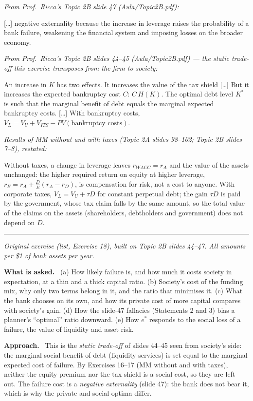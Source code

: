 \documentclass[11pt,a4paper]{article}
\numberwithin{equation}{section}
\newcommand{\asked}{\par\medskip\noindent\textbf{What is asked.}~}
\newcommand{\approach}{\par\smallskip\noindent\textbf{Approach.}~}
\newcommand{\stmtend}{\par\endgroup\nopagebreak\noindent\rule{\linewidth}{0.4pt}\par\medskip}
\begin{document}
\emph{From Prof.~Ricca's Topic 2B slide 47 (Aula/Topic2B.pdf):}

{[}\ldots{]} negative externality because the increase in leverage raises the probability of a bank
failure, weakening the financial system and imposing losses on the broader economy.

\emph{From Prof.~Ricca's Topic 2B slides 44--45 (Aula/Topic2B.pdf) --- the static trade-off this
exercise transposes from the firm to society:}

An increase in \(K\) has two effects. It increases the value of the tax shield {[}\ldots{]} But it
increases the expected bankruptcy cost \(C\): \(C\,H(K)\). The optimal debt level \(K^*\) is such
that the marginal benefit of debt equals the marginal expected bankruptcy costs. {[}\ldots{]} With
bankruptcy costs, \(V_L = V_U + V_{ITS} - PV(\text{bankruptcy costs})\).

\emph{Results of MM without and with taxes (Topic 2A slides 98--102; Topic 2B slides 7--8),
restated:}

Without taxes, a change in leverage leaves \(r_{WACC} = r_A\) and the value of the assets unchanged:
the higher required return on equity at higher leverage, \(r_E = r_A + \frac{D}{E}(r_A - r_D)\), is
compensation for risk, not a cost to anyone. With corporate taxes, \(V_L = V_U + \tau D\) for
constant perpetual debt; the gain \(\tau D\) is paid by the government, whose tax claim falls by the
same amount, so the total value of the claims on the assets (shareholders, debtholders and
government) does not depend on \(D\).
\stmtend

\noindent\textit{Original exercise (list, Exercise 18), built on Topic 2B slides 44--47. All amounts
per \$1 of bank assets per year.}

\asked
(a) How likely failure is, and how much it costs society in expectation, at a thin and a thick capital ratio.
(b) Society's cost of the funding mix, why only two terms belong in it, and the ratio that minimises it.
(c) What the bank chooses on its own, and how its private cost of more capital compares with society's gain.
(d) How the slide-47 fallacies (Statements 2 and 3) bias a planner's ``optimal'' ratio downward.
(e) How $e^*$ responds to the social loss of a failure, the value of liquidity and asset risk.

\approach
This is the \emph{static trade-off} of slides 44--45 seen from society's side: the marginal social
benefit of debt (liquidity services) is set equal to the marginal expected cost of failure. By
Exercises 16--17 (MM without and with taxes), neither the equity premium nor the tax shield is a
social cost, so they are left out. The failure cost is a \emph{negative externality} (slide 47): the
bank does not bear it, which is why the private and social optima differ.
\end{document}

